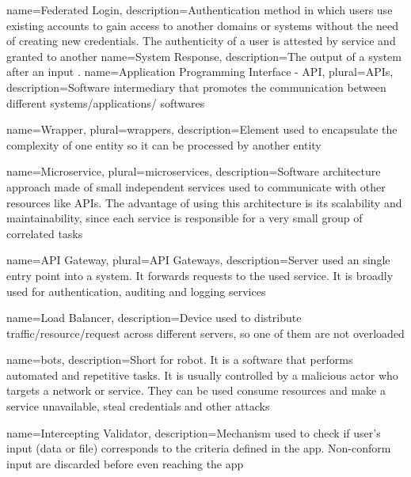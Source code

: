  {
    name={Federated Login},
    description={Authentication method in which users use existing accounts to gain access to another domains or systems
    without the need of creating new credentials. The authenticity of a user is attested by service and granted to another 
    \cite{refonline:MRFL}}
}
 {
    name={System Response},
    description={The output of a system after an input \cite{refonline:HWHE}.
    \cite{refonline:MRFL}}
}
 {
    name={Application Programming Interface - API},
    plural={APIs},
    description={Software intermediary that promotes the communication between different systems/applications/
    softwares\cite{refonline:MSAPI}}
}

 {
    name={Wrapper},
    plural={wrappers},
    description={Element used to encapsulate the complexity of one entity so it can be processed by another entity 
    \cite{refonline:techwrap}}
}

 {
    name={Microservice},
    plural={microservices},
    description={Software architecture approach made of small independent services used to communicate with other
    resources like APIs. The advantage of using this architecture is its scalability and maintainability, since 
    each service is responsible for a very small group of correlated tasks \cite{refonline:awsmicro}}
}

 {
    name={API Gateway},
    plural={API Gateways},
    description={Server used an single entry point into a system. It forwards requests to the used service. It is 
    broadly used for authentication, auditing and logging services \cite{refonline:crpag}}
}

 {
    name={Load Balancer},
    description={Device used to distribute traffic/resource/request across different servers, so one of them
    are not overloaded \cite{refonline:nglb}}
}

 {
    name={bots},
    description={Short for robot. It is a software that performs automated and repetitive tasks. It is usually
    controlled by a malicious actor who targets a network or service. They can be used consume resources
    and make a service unavailable, steal credentials and other attacks \cite{refonline:kpbot}}
}

 {
    name={Intercepting Validator},
    description={Mechanism used to check if user's input (data or file) corresponds to the criteria defined in
    the app. Non-conform input are discarded before even reaching the app \cite{refonline:kpbot}}
}






